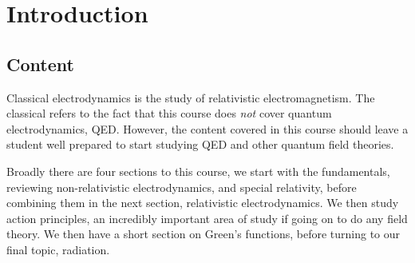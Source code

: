 \chapter{Introduction}
\section{Content}
Classical electrodynamics is the study of relativistic electromagnetism.
The classical refers to the fact that this course does \emph{not} cover quantum electrodynamics, QED.
However, the content covered in this course should leave a student well prepared to start studying QED and other quantum field theories.

Broadly there are four sections to this course, we start with the fundamentals, reviewing non-relativistic electrodynamics, and special relativity, before combining them in the next section, relativistic electrodynamics.
We then study action principles, an incredibly important area of study if going on to do any field theory.
We then have a short section on Green's functions, before turning to our final topic, radiation.

